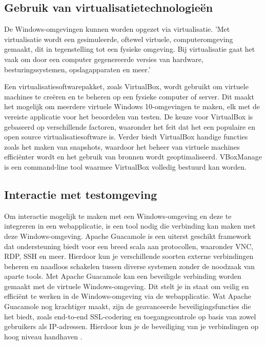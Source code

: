 \subsection{Gebruik van virtualisatietechnologieën}
De Windows-omgevingen kunnen worden opgezet via virtualisatie. 'Met virtualisatie wordt een gesimuleerde, oftewel virtuele, computeromgeving gemaakt, dit in tegenstelling tot een fysieke omgeving. Bij virtualisatie gaat het vaak om door een computer gegenereerde versies van hardware, besturingssystemen, opslagapparaten en meer.' \autocite{MicrosoftVirtualisationDefinition}

Een virtualisatiesoftwarepakket, zoals VirtualBox, wordt gebruikt om virtuele machines te creëren en te beheren op een fysieke computer of server. Dit maakt het mogelijk om meerdere virtuele Windows 10-omgevingen te maken, elk met de vereiste applicatie voor het beoordelen van testen. De keuze voor VirtualBox is gebaseerd op verschillende factoren, waaronder het feit dat het een populaire en open source virtualisatiesoftware is. Verder biedt VirtualBox handige functies zoals het maken van snapshots, waardoor het beheer van virtuele machines efficiënter wordt en het gebruik van bronnen wordt geoptimaliseerd. VBoxManage is een command-line tool waarmee VirtualBox volledig bestuurd kan worden.


\subsection{Interactie met testomgeving}
Om interactie mogelijk te maken met een Wi\-ndows-omgeving en deze te integreren in een webapplicatie, is een tool nodig die verbinding kan maken met deze Windows-omgeving. Apache Guacamole is een uiterst geschikt framework dat ondersteuning biedt voor een breed scala aan protocollen, waaronder VNC, RDP, SSH en meer. Hierdoor kun je verschillende soorten externe verbindingen beheren en naadloos schakelen tussen diverse systemen zonder de noodzaak van aparte tools.
Met Apache Guacamole kan een beveiligde verbinding worden gemaakt met de virtuele Windows-omgeving. Dit stelt je in staat om veilig en efficiënt te werken in de Windows-omgeving via de webapplicatie. Wat Apache Guacamole nog krachtiger maakt, zijn de geavanceerde beveiligingsfuncties die het biedt, zoals end-to-end SSL-codering en toegangscontrole op basis van zowel gebruikers als IP-adressen. Hierdoor kun je de beveiliging van je verbindingen op hoog niveau handhaven \autocite{ApacheGuacamole}.

